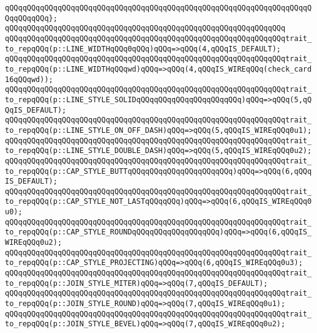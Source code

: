 \verb|qQQqqQQqqQQqqQQqqQQqqQQqqQQqqQQqqQQqqQQqqQQqqQQqqQQqqQQqqQQqqQQqqQQqqQQqqQQqqQQq};|\newline
\verb|qQQqqQQqqQQqqQQqqQQqqQQqqQQqqQQqqQQqqQQqqQQqqQQqqQQqqQQqqQQqqQQq|\newline
\verb|qQQqqQQqqQQqqQQqqQQqqQQqqQQqqQQqqQQqqQQqqQQqqQQqqQQqqQQqqQQqqQQqtrait_to_repqQQq(p::LINE_WIDTHqQQq0qQQq)qQQq=>qQQq(4,qQQqIS_DEFAULT);|\newline
\verb|qQQqqQQqqQQqqQQqqQQqqQQqqQQqqQQqqQQqqQQqqQQqqQQqqQQqqQQqqQQqqQQqtrait_to_repqQQq(p::LINE_WIDTHqQQqwd)qQQq=>qQQq(4,qQQqIS_WIREqQQq(check_card16qQQqwd));|\newline
\newline
\verb|qQQqqQQqqQQqqQQqqQQqqQQqqQQqqQQqqQQqqQQqqQQqqQQqqQQqqQQqqQQqqQQqtrait_to_repqQQq(p::LINE_STYLE_SOLIDqQQqqQQqqQQqqQQqqQQqqQQq)qQQq=>qQQq(5,qQQqIS_DEFAULT);|\newline
\verb|qQQqqQQqqQQqqQQqqQQqqQQqqQQqqQQqqQQqqQQqqQQqqQQqqQQqqQQqqQQqqQQqtrait_to_repqQQq(p::LINE_STYLE_ON_OFF_DASH)qQQq=>qQQq(5,qQQqIS_WIREqQQq0u1);|\newline
\verb|qQQqqQQqqQQqqQQqqQQqqQQqqQQqqQQqqQQqqQQqqQQqqQQqqQQqqQQqqQQqqQQqtrait_to_repqQQq(p::LINE_STYLE_DOUBLE_DASH)qQQq=>qQQq(5,qQQqIS_WIREqQQq0u2);|\newline
\newline
\verb|qQQqqQQqqQQqqQQqqQQqqQQqqQQqqQQqqQQqqQQqqQQqqQQqqQQqqQQqqQQqqQQqtrait_to_repqQQq(p::CAP_STYLE_BUTTqQQqqQQqqQQqqQQqqQQqqQQq)qQQq=>qQQq(6,qQQqIS_DEFAULT);|\newline
\verb|qQQqqQQqqQQqqQQqqQQqqQQqqQQqqQQqqQQqqQQqqQQqqQQqqQQqqQQqqQQqqQQqtrait_to_repqQQq(p::CAP_STYLE_NOT_LASTqQQqqQQq)qQQq=>qQQq(6,qQQqIS_WIREqQQq0u0);|\newline
\verb|qQQqqQQqqQQqqQQqqQQqqQQqqQQqqQQqqQQqqQQqqQQqqQQqqQQqqQQqqQQqqQQqtrait_to_repqQQq(p::CAP_STYLE_ROUNDqQQqqQQqqQQqqQQqqQQq)qQQq=>qQQq(6,qQQqIS_WIREqQQq0u2);|\newline
\verb|qQQqqQQqqQQqqQQqqQQqqQQqqQQqqQQqqQQqqQQqqQQqqQQqqQQqqQQqqQQqqQQqtrait_to_repqQQq(p::CAP_STYLE_PROJECTING)qQQq=>qQQq(6,qQQqIS_WIREqQQq0u3);|\newline
\newline
\verb|qQQqqQQqqQQqqQQqqQQqqQQqqQQqqQQqqQQqqQQqqQQqqQQqqQQqqQQqqQQqqQQqtrait_to_repqQQq(p::JOIN_STYLE_MITER)qQQq=>qQQq(7,qQQqIS_DEFAULT);|\newline
\verb|qQQqqQQqqQQqqQQqqQQqqQQqqQQqqQQqqQQqqQQqqQQqqQQqqQQqqQQqqQQqqQQqtrait_to_repqQQq(p::JOIN_STYLE_ROUND)qQQq=>qQQq(7,qQQqIS_WIREqQQq0u1);|\newline
\verb|qQQqqQQqqQQqqQQqqQQqqQQqqQQqqQQqqQQqqQQqqQQqqQQqqQQqqQQqqQQqqQQqtrait_to_repqQQq(p::JOIN_STYLE_BEVEL)qQQq=>qQQq(7,qQQqIS_WIREqQQq0u2);|\newline
